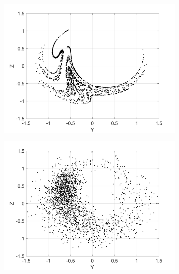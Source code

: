 \documentclass[12pt]{article}
\begin{document}
\begin{figure}[H]
	\centering
	\begin{subfigure}[b]{0.3\textwidth}
		\centering
		\includegraphics[width=\textwidth]{plots/l84l63/poincare_yz_u5.png}
	\end{subfigure}
	\hfill
	\begin{subfigure}[b]{0.3\textwidth}
		\centering
		\includegraphics[width=\textwidth]{plots/l84l63/poincare_yz_c5.png}
	\end{subfigure}
	\hfill
	\begin{subfigure}[b]{0.3\textwidth}
		\centering

\end{subfigure}
\end{figure}
\end{document}
